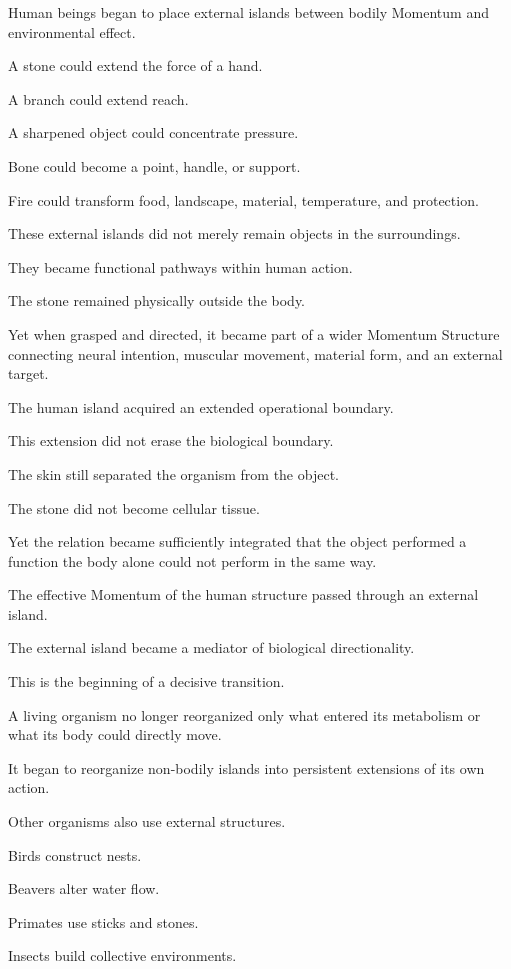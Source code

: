 Human beings began to place external islands between bodily Momentum and environmental effect.

A stone could extend the force of a hand.

A branch could extend reach.

A sharpened object could concentrate pressure.

Bone could become a point, handle, or support.

Fire could transform food, landscape, material, temperature, and protection.

These external islands did not merely remain objects in the surroundings.

They became functional pathways within human action.

The stone remained physically outside the body.

Yet when grasped and directed, it became part of a wider Momentum Structure connecting neural intention, muscular movement, material form, and an external target.

The human island acquired an extended operational boundary.

This extension did not erase the biological boundary.

The skin still separated the organism from the object.

The stone did not become cellular tissue.

Yet the relation became sufficiently integrated that the object performed a function the body alone could not perform in the same way.

The effective Momentum of the human structure passed through an external island.

The external island became a mediator of biological directionality.

This is the beginning of a decisive transition.

A living organism no longer reorganized only what entered its metabolism or what its body could directly move.

It began to reorganize non-bodily islands into persistent extensions of its own action.

Other organisms also use external structures.

Birds construct nests.

Beavers alter water flow.

Primates use sticks and stones.

Insects build collective environments.

